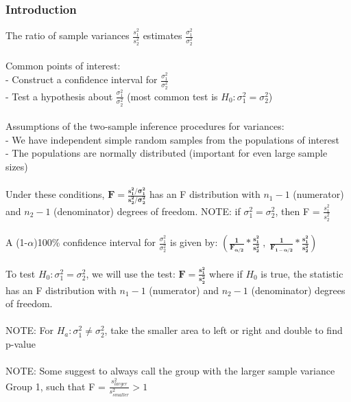 \documentclass[12pt, a4paper]{article}
\begin{document}
	\subsubsection{Introduction}
	The ratio of sample variances $\frac{s^2_1}{s^2_2}$ estimates $\frac{\sigma^2_1}{\sigma^2_2}$ \\~\\
	Common points of interest: \\
	- Construct a confidence interval for $\frac{\sigma^2_1}{\sigma^2_2}$ \\
	- Test a hypothesis about $\frac{\sigma^2_1}{\sigma^2_2}$ (most common test is $H_0: \sigma_1^2 = \sigma_2^2$)\\~\\
	Assumptions of the two-sample inference procedures for variances: \\
	- We have independent simple random samples from the populations of interest \\
	- The populations are normally distributed (important for even large sample sizes) \\~\\ 
	Under these conditions, \large $\bm{F = \frac{s^2_1/\sigma^2_1}{s^2_2/\sigma^2_2}}$ \normalsize has an F distribution with $n_1-1$ (numerator) and $n_2-1$ (denominator) degrees of freedom. NOTE: if $\sigma_1^2 = \sigma_2^2$, then F = $\frac{s^2_1}{s^2_2}$ \\~\\
	A (1-$\alpha$)100\% confidence interval for $\frac{\sigma^2_1}{\sigma^2_2}$ is given by: \large $\bm{(\frac{1}{F_{\alpha/2}}*\frac{s^2_1}{s^2_2}\;,\;\frac{1}{F_{1-\alpha/2}}*\frac{s^2_1}{s^2_2})}$ \normalsize \\~\\
	To test $H_0: \sigma_1^2 = \sigma_2^2$, we will use the test: $\bm{F = \frac{s^2_1}{s^2_2}}$ where if $H_0$ is true, the statistic has an F distribution with $n_1-1$ (numerator) and $n_2-1$ (denominator) degrees of freedom. \\~\\
	NOTE: For $H_a: \sigma_1^2 \neq \sigma^2_2$, take the smaller area to left or right and double to find p-value \\~\\
	NOTE: Some suggest to always call the group with the larger sample variance Group 1, such that F = $\frac{s^2_{larger}}{s^2_{smaller}} > 1$ \newpage
	
\end{document}
